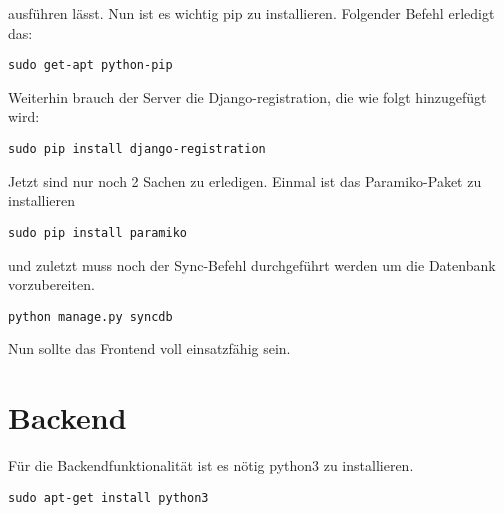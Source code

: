ausführen lässt. 
Nun ist es wichtig pip zu installieren. Folgender Befehl erledigt das:
\begin{lstlisting}
sudo get-apt python-pip
\end{lstlisting}
Weiterhin brauch der Server die Django-registration, die wie folgt hinzugefügt wird:
\begin{lstlisting}
sudo pip install django-registration
\end{lstlisting}
Jetzt sind nur noch 2 Sachen zu erledigen. Einmal ist das Paramiko-Paket zu installieren 
\begin{lstlisting}
sudo pip install paramiko
\end{lstlisting}
und zuletzt muss noch der Sync-Befehl durchgeführt werden um die Datenbank vorzubereiten.
\begin{lstlisting}
python manage.py syncdb
\end{lstlisting}
Nun sollte das Frontend voll einsatzfähig sein.
\section{Backend}
Für die Backendfunktionalität ist es nötig python3 zu installieren.
\begin{lstlisting}
sudo apt-get install python3
\end{lstlisting}


